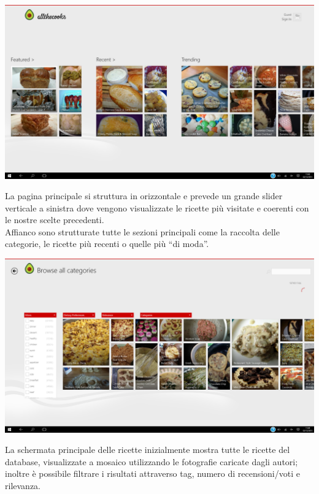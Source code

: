 \begin{center}
\includegraphics[scale=0.275] {img/Allthecooks/home_3.png}  
\end{center}

La pagina principale si struttura in orizzontale e prevede un grande slider verticale a sinistra dove vengono visualizzate le ricette più visitate e coerenti con le nostre scelte precedenti.\\
Affianco sono strutturate tutte le sezioni principali come la raccolta delle categorie, le ricette più recenti o quelle più ``di moda''.\\


\begin{center}
\includegraphics[scale=0.27] {img/Allthecooks/categorie.png}  
\end{center}

La schermata principale delle ricette inizialmente mostra tutte le ricette del database, visualizzate a mosaico utilizzando le fotografie caricate dagli autori; inoltre è possibile filtrare i risultati attraverso tag, numero di recensioni/voti e rilevanza.\\


